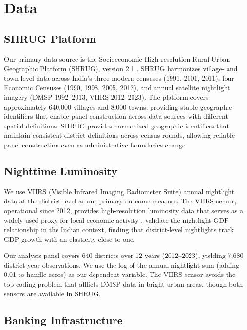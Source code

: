 \documentclass[12pt]{article}
\begin{document}
\section{Data}\label{sec:data}

\subsection{SHRUG Platform}

Our primary data source is the Socioeconomic High-resolution Rural-Urban Geographic Platform (SHRUG), version 2.1 \citep{asher2021shrug}. SHRUG harmonizes village- and town-level data across India's three modern censuses (1991, 2001, 2011), four Economic Censuses (1990, 1998, 2005, 2013), and annual satellite nightlight imagery (DMSP 1992--2013, VIIRS 2012--2023). The platform covers approximately 640,000 villages and 8,000 towns, providing stable geographic identifiers that enable panel construction across data sources with different spatial definitions. SHRUG provides harmonized geographic identifiers that maintain consistent district definitions across census rounds, allowing reliable panel construction even as administrative boundaries change.

\subsection{Nighttime Luminosity}

We use VIIRS (Visible Infrared Imaging Radiometer Suite) annual nightlight data at the district level as our primary outcome measure. The VIIRS sensor, operational since 2012, provides high-resolution luminosity data that serves as a widely-used proxy for local economic activity \citep{henderson2012measuring}. \citet{chodorow2020cash} validate the nightlight-GDP relationship in the Indian context, finding that district-level nightlights track GDP growth with an elasticity close to one.

Our analysis panel covers 640 districts over 12 years (2012--2023), yielding 7,680 district-year observations. We use the log of the annual nightlight sum (adding 0.01 to handle zeros) as our dependent variable. The VIIRS sensor avoids the top-coding problem that afflicts DMSP data in bright urban areas, though both sensors are available in SHRUG.

\subsection{Banking Infrastructure}
\end{document}
